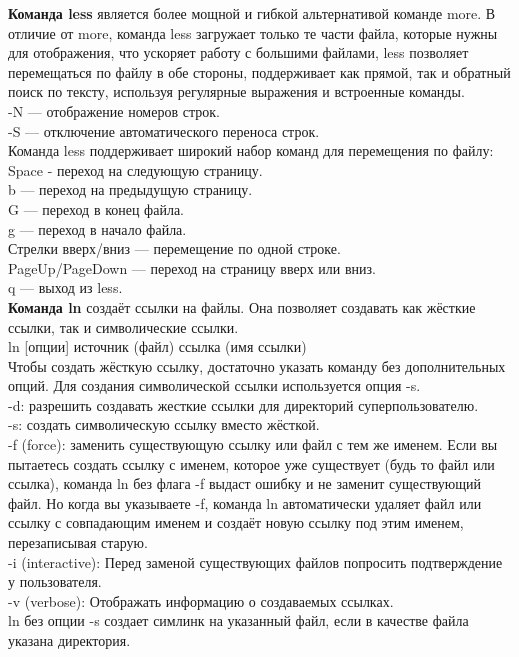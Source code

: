 \noindent \textbf{Команда less} является более мощной и гибкой альтернативой команде more. В отличие от more, команда less загружает только те части файла, которые нужны для отображения, что ускоряет работу с большими файлами, less позволяет перемещаться по файлу в обе стороны, поддерживает как прямой, так и обратный поиск по тексту, используя регулярные выражения и встроенные команды. \\
-N — отображение номеров строк. \\
-S — отключение автоматического переноса строк. \\
Команда less поддерживает широкий набор команд для перемещения по файлу: \\
Space - переход на следующую страницу. \\
b — переход на предыдущую страницу. \\
G — переход в конец файла. \\
g — переход в начало файла. \\
Стрелки вверх/вниз — перемещение по одной строке. \\
PageUp/PageDown — переход на страницу вверх или вниз. \\
q — выход из less. \\

\noindent \textbf{Команда ln} создаёт ссылки на файлы. Она позволяет создавать как жёсткие ссылки, так и символические ссылки. \\
ln [опции] источник (файл) ссылка (имя ссылки) \\
Чтобы создать жёсткую ссылку, достаточно указать команду без дополнительных опций. Для создания символической ссылки используется опция -s. \\
-d: разрешить создавать жесткие  ссылки для директорий суперпользователю. \\
-s: создать символическую ссылку вместо жёсткой. \\
-f (force): заменить существующую ссылку или файл с тем же именем. Если вы пытаетесь создать ссылку с именем, которое уже существует (будь то файл или ссылка), команда ln без флага -f выдаст ошибку и не заменит существующий файл. Но когда вы указываете -f, команда ln автоматически удаляет файл или ссылку с совпадающим именем и создаёт новую ссылку под этим именем, перезаписывая старую.\\
-i (interactive): Перед заменой существующих файлов попросить подтверждение у пользователя. \\
-v (verbose): Отображать информацию о создаваемых ссылках. \\
ln без опции -s создает симлинк на указанный файл, если в качестве файла указана директория. \\

